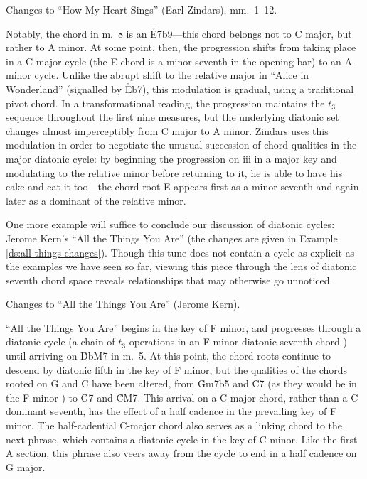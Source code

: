 \documentclass[diss]{subfiles}
\begin{document}
\exBeg[htbp]
  \caption{Changes to “How My Heart Sings” (Earl Zindars), mm.~1--12.}
  \label{ds:heart-sings-changes}
\exEnd

Notably, the chord in m.~8 is an \h{E7b9}---this chord belongs not to C major,
but rather to A minor. At some point, then, the progression shifts from taking
place in a C-major cycle (the E chord is a minor seventh in the opening bar)
to an A-minor cycle. Unlike the abrupt shift to the relative major in “Alice
in Wonderland” (signalled by \h{Eb7}), this modulation is gradual, using a
traditional pivot chord. In a transformational reading, the
progression maintains the $t_3$ sequence throughout the first nine measures,
but the underlying diatonic set changes almost imperceptibly from C major to A
minor. Zindars uses this modulation in order to negotiate the unusual
succession of chord qualities in the major diatonic cycle: by beginning the
progression on iii in a major key and modulating to the relative minor before
returning to it, he is able to have his cake and eat it too---the chord root E
appears first as a minor seventh and again later as a dominant of the relative
minor.

One more example will suffice to conclude our discussion of diatonic cycles:
Jerome Kern’s “All the Things You Are” (the changes are given in Example
\ref{ds:all-things-changes}). Though this tune does not contain a
cycle as explicit as the examples we have seen so far, viewing this piece
through the lens of diatonic seventh chord space reveals relationships that may
otherwise go unnoticed.

\exBeg[htbp]
  \caption{Changes to “All the Things You Are” (Jerome Kern).}
  \label{ds:all-things-changes}
\exEnd

“All the Things You Are” begins in the key of F minor, and progresses through
a diatonic cycle (a chain of $t_3$ operations in an F-minor diatonic
seventh-chord \gis{}) until arriving on \h{DbM7} in m.~5. At this point, the
chord roots continue to descend by diatonic fifth in the key of F minor, but
the qualities of the chords rooted on G and C have been altered, from
\h{Gm7b5} and \h{C7} (as they would be in the F-minor \gis{}) to \h{G7} and
\h{CM7}. This arrival on a C major chord, rather than a C dominant seventh,
has the effect of a half cadence in the prevailing key of F minor. The
half-cadential C-major chord also serves as a linking chord to the next
phrase, which contains a diatonic cycle in the key of C minor. Like the first
A section, this phrase also veers away from the cycle to end in a half cadence
on G major.
\end{document}
